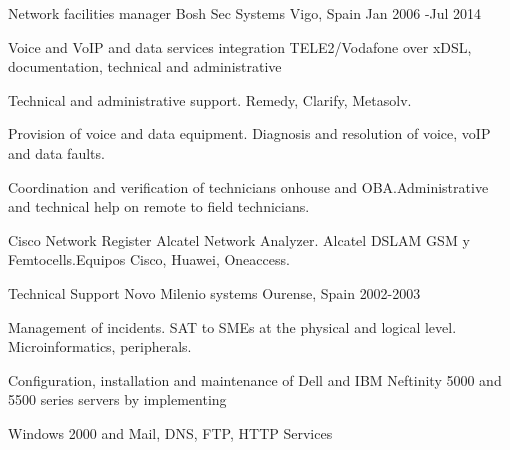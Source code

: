 \begin{cventries}

  \cventry
    {Network facilities manager} %
    {Bosh Sec Systems} %
    {Vigo, Spain} %
    {Jan 2006 -Jul 2014} %
    {
      \begin{cvitems} %
       \item {Voice and VoIP and data services integration TELE2/Vodafone over xDSL, documentation, technical and administrative}
       \item {Technical and administrative support. Remedy, Clarify, Metasolv.}
       \item {Provision of voice and data equipment. Diagnosis and resolution of voice, voIP and data faults.}
       \item {Coordination and verification of technicians onhouse and OBA.Administrative and technical help on remote to field technicians.}
       \item {Cisco Network Register Alcatel Network Analyzer. Alcatel DSLAM GSM y Femtocells.Equipos Cisco, Huawei, Oneaccess.} 
      \end{cvitems}
    }


  \cventry
    {Technical Support} %
    {Novo Milenio systems} %
    {Ourense, Spain} %
    {2002-2003} %
    {
      \begin{cvitems} %
        \item {Management of incidents. SAT to SMEs at the physical and logical level. Microinformatics, peripherals.}
        \item {Configuration, installation and maintenance of Dell and IBM Neftinity 5000 and 5500 series servers by implementing}
        \item { Windows 2000 and Mail, DNS, FTP, HTTP Services}
      \end{cvitems}
    }

\end{cventries}
